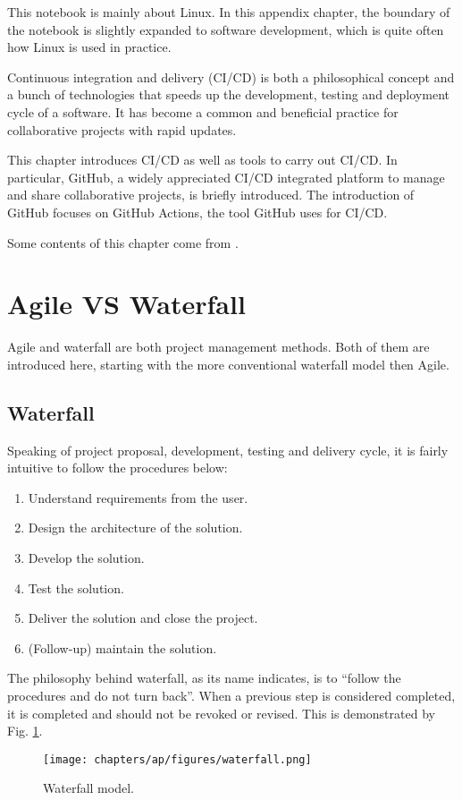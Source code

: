 This notebook is mainly about Linux. In this appendix chapter, the boundary of the notebook is slightly expanded to software development, which is quite often how Linux is used in practice.

Continuous integration and delivery (CI/CD) is both a philosophical concept and a bunch of technologies that speeds up the development, testing and deployment cycle of a software. It has become a common and beneficial practice for collaborative projects with rapid updates.

This chapter introduces CI/CD as well as tools to carry out CI/CD. In particular, GitHub, a widely appreciated CI/CD integrated platform to manage and share collaborative projects, is briefly introduced. The introduction of GitHub focuses on GitHub Actions, the tool GitHub uses for CI/CD.

Some contents of this chapter come from \cite{honai2023cicd}.

\section{Agile VS Waterfall}

Agile and waterfall are both project management methods. Both of them are introduced here, starting with the more conventional waterfall model then Agile.

\subsection{Waterfall}

Speaking of project proposal, development, testing and delivery cycle, it is fairly intuitive to follow the procedures below:
\begin{enumerate}
	\item Understand requirements from the user.
	\item Design the architecture of the solution.
	\item Develop the solution.
	\item Test the solution.
	\item Deliver the solution and close the project.
	\item (Follow-up) maintain the solution.
\end{enumerate}
The philosophy behind waterfall, as its name indicates, is to ``follow the procedures and do not turn back''. When a previous step is considered completed, it is completed and should not be revoked or revised. This is demonstrated by Fig. \ref{ch:cicd:fig:waterfall}.
\begin{figure}[htbp]
	\centering
	\texttt{[image: chapters/ap/figures/waterfall.png]}
	\caption{Waterfall model.} \label{ch:cicd:fig:waterfall}
\end{figure}

